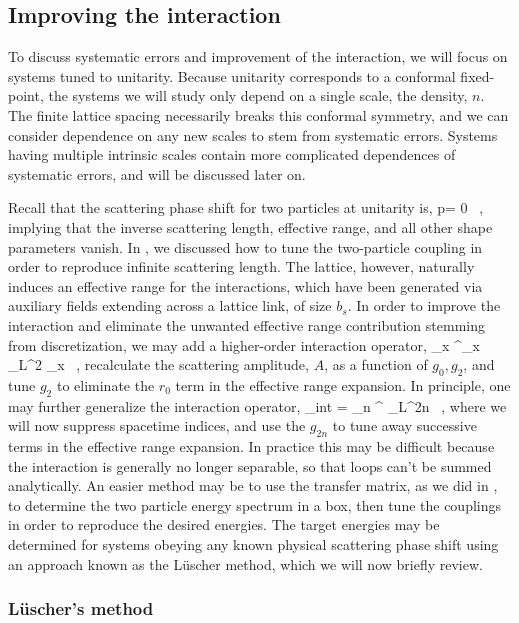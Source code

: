 \subsection{\label{sec:improve}Improving the interaction}
To discuss systematic errors and improvement of the interaction, we will focus on systems tuned to unitarity. Because unitarity corresponds to a conformal fixed-point, the systems we will study only depend on a single scale, the density, $n$. The finite lattice spacing necessarily breaks this conformal symmetry, and we can consider dependence on any new scales to stem from systematic errors. Systems having multiple intrinsic scales contain more complicated dependences of systematic errors, and will be discussed later on. 

Recall that the scattering phase shift for two particles at unitarity is,
\beq
p\cot\delta = 0 \ , 
\eeq
implying that the inverse scattering length, effective range, and all other shape parameters vanish. In , we discussed how to tune the two-particle coupling in order to reproduce infinite scattering length. The lattice, however, naturally induces an effective range for the interactions, which have been generated via auxiliary fields extending across a lattice link, of size $b_s$. In order to improve the interaction and eliminate the unwanted effective range contribution stemming from discretization, we may add a higher-order interaction operator,
\beq
\sum_{{\mathbf x}} \phi \psi^{\dagger}_{{\mathbf x}} \nabla_L^2 \psi_{{\mathbf x}} \ ,
\eeq
recalculate the scattering amplitude, $A$, as a function of $g_0, g_2$, and tune $g_2$ to eliminate the $r_0$ term in the effective range expansion. In principle, one may further generalize the interaction operator,
\beq
{}_{\mbox{\tiny int}} = \sum_n   \phi \psi^{\dagger} \nabla_L^{2n} \psi \ ,
\eeq
where we will now suppress spacetime indices, and use the $g_{2n}$ to tune away successive terms in the effective range expansion. In practice this may be difficult because the interaction is generally no longer separable, so that loops can't be summed analytically. An easier method may be to use the transfer matrix, as we did in , to determine the two particle energy spectrum in a box, then tune the couplings in order to reproduce the desired energies. The target energies may be determined for systems obeying any known physical scattering phase shift using an approach known as the L\"uscher method, which we will now briefly review.

\subsubsection{\label{sec:Luscher}L\"uscher's method}

